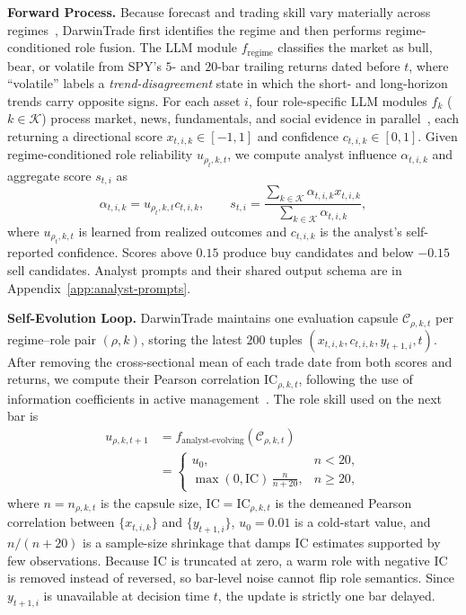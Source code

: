 \documentclass[letterpaper]{article}
\begin{document}
\textbf{Forward Process.}\quad
Because forecast and trading skill vary materially across
regimes~\citep{zhang2025regimefolio,jeon2026blindtrade}, DarwinTrade first
identifies the regime and then performs regime-conditioned role fusion.
The LLM module $f_{\text{regime}}$ classifies the market as bull, bear, or
volatile from SPY's $5$- and $20$-bar trailing returns dated before $t$,
where ``volatile'' labels a \emph{trend-disagreement} state in which the
short- and long-horizon trends carry opposite signs. For each asset $i$,
four role-specific LLM modules $f_k$ ($k\in\mathcal{K}$) process market,
news, fundamentals, and social evidence in
parallel~\citep{xiao2024tradingagents,rashid2026finanalyst}, each returning
a directional score $x_{t,i,k}\in[-1,1]$ and confidence
$c_{t,i,k}\in[0,1]$. Given regime-conditioned role reliability
$u_{\rho_t,k,t}$, we compute analyst influence $\alpha_{t,i,k}$ and
aggregate score $s_{t,i}$ as
\begin{equation}
\alpha_{t,i,k}=u_{\rho_t,k,t}c_{t,i,k},
\qquad
s_{t,i}=\frac{\sum_{k\in\mathcal{K}}\alpha_{t,i,k}x_{t,i,k}}
                  {\sum_{k\in\mathcal{K}}\alpha_{t,i,k}},
\label{eq:analyst-fusion}
\end{equation}
where $u_{\rho_t,k,t}$ is learned from realized outcomes and $c_{t,i,k}$
is the analyst's self-reported confidence. Scores above $0.15$ produce
buy candidates and below $-0.15$ sell candidates. Analyst prompts and
their shared output schema are in Appendix~\ref{app:analyst-prompts}.

\textbf{Self-Evolution Loop.}\quad
DarwinTrade maintains one evaluation capsule $\mathcal{C}_{\rho,k,t}$
per regime--role pair $(\rho,k)$, storing the latest $200$ tuples
$(x_{t,i,k},c_{t,i,k},y_{t+1,i},t)$. After removing the cross-sectional
mean of each trade date from both scores and returns, we compute their
Pearson correlation $\mathrm{IC}_{\rho,k,t}$, following the use of
information coefficients in active
management~\citep{grinold2000active}. The role skill used on the next
bar is
\begin{equation}
\begin{aligned}
u_{\rho,k,t+1}
  &= f_{\text{analyst-evolving}}(\mathcal{C}_{\rho,k,t}) \\
  &= \begin{cases}
  u_0, & n<20,\\
  \max(0,\mathrm{IC})\,\frac{n}{n+20}, & n\geq 20,
  \end{cases}
\end{aligned}
\label{eq:analyst-evolving}
\end{equation}
where $n=n_{\rho,k,t}$ is the capsule size, $\mathrm{IC}=
\mathrm{IC}_{\rho,k,t}$ is the demeaned Pearson correlation between
$\{x_{t,i,k}\}$ and $\{y_{t+1,i}\}$, $u_0=0.01$ is a cold-start value,
and $n/(n{+}20)$ is a sample-size shrinkage that damps IC estimates
supported by few observations. Because $\mathrm{IC}$ is truncated at
zero, a warm role with negative IC is removed instead of reversed, so
bar-level noise cannot flip role semantics. Since $y_{t+1,i}$ is
unavailable at decision time $t$, the update is strictly one bar
delayed.
\end{document}

